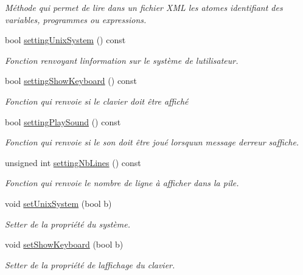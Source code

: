 \begin{DoxyCompactItemize}
\begin{DoxyCompactList}\small\item\em Méthode qui permet de lire dans un fichier X\+ML les atomes identifiant des variables, programmes ou expressions. \end{DoxyCompactList}\item 
bool \hyperlink{class_controller_a5c074d5268cdd0161828d24c667b0b11}{setting\+Unix\+System} () const 
\begin{DoxyCompactList}\small\item\em Fonction renvoyant l\textquotesingle{}information sur le système de l\textquotesingle{}utilisateur. \end{DoxyCompactList}\item 
bool \hyperlink{class_controller_a6c72205e8a4027fc5ec1d0cc382c4991}{setting\+Show\+Keyboard} () const 
\begin{DoxyCompactList}\small\item\em Fonction qui renvoie si le clavier doit être affiché \end{DoxyCompactList}\item 
bool \hyperlink{class_controller_add8a301578599be2e173b206e05f2bcb}{setting\+Play\+Sound} () const 
\begin{DoxyCompactList}\small\item\em Fonction qui renvoie si le son doit être joué lorsqu\textquotesingle{}un message d\textquotesingle{}erreur s\textquotesingle{}affiche. \end{DoxyCompactList}\item 
unsigned int \hyperlink{class_controller_aa2c85340d19b0833c27f628aa53a29d6}{setting\+Nb\+Lines} () const 
\begin{DoxyCompactList}\small\item\em Fonction qui renvoie le nombre de ligne à afficher dans la pile. \end{DoxyCompactList}\item 
void \hyperlink{class_controller_ac7a044e47942d35a48546b6bee173114}{set\+Unix\+System} (bool b)
\begin{DoxyCompactList}\small\item\em Setter de la propriété du système. \end{DoxyCompactList}\item 
void \hyperlink{class_controller_ac1f29fbc2190496d42b05734f38e7b7e}{set\+Show\+Keyboard} (bool b)
\begin{DoxyCompactList}\small\item\em Setter de la propriété de l\textquotesingle{}affichage du clavier. \end{DoxyCompactList}\item 

\end{DoxyCompactItemize}
